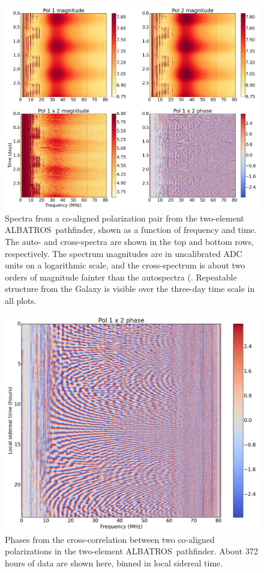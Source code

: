 \documentclass{ws-jai}
\def\albatros{ALBATROS}
\begin{document}
\begin{figure}[t]
  \begin{center}
    \includegraphics[width=\linewidth]{Figures/albatros2_waterfalls.jpg}
    \caption{Spectra from a co-aligned polarization pair from the
      two-element \albatros\ pathfinder, shown as a function of
      frequency and time.  The auto- and cross-spectra are shown in
      the top and bottom rows, respectively.  The spectrum magnitudes
      are in uncalibrated ADC units on a logarithmic scale, and the
      cross-spectrum is about two orders of magnitude fainter than the
      autospectra (.  Repeatable structure from the Galaxy is visible
      over the three-day time scale in all plots.}
    \label{Fig:albatros2_waterfalls}
  \end{center}
\end{figure}

\begin{figure}[t]
  \begin{center}
    \includegraphics[width=0.8\linewidth]{Figures/albatros2_lst_phase.jpg}
    \caption{Phases from the cross-correlation between two co-aligned
      polarizations in the two-element \albatros\ pathfinder.  About
      372 hours of data are shown here, binned in local sidereal
      time.}
    \label{Fig:albatros2_phase}
  \end{center}
\end{figure}
\end{document}
